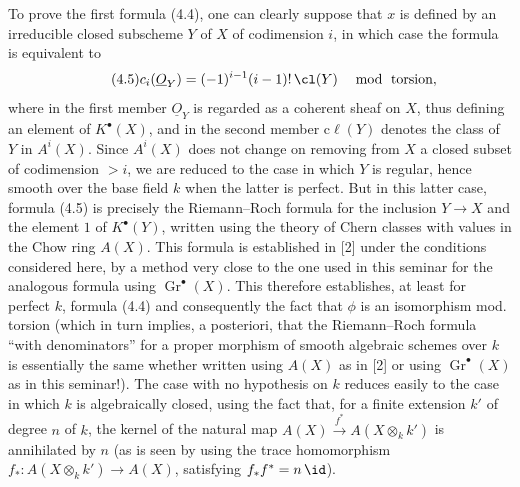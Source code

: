 To prove the first formula (4.4), one can clearly suppose that $x$ is defined by an irreducible closed subscheme $Y$ of $X$ of codimension $i$, in which case the formula is equivalent to
%
\begin{equation}\tag{4.5}
 c_i(\underline{O}_Y)=(-1)^{i-1}(i-1)!\,\cl(Y)\quad \bmod
\text{ torsion},
\end{equation}
where in the first member $\underline{O}_Y$ is regarded as a coherent sheaf on $X$, thus defining an element of $K^\bullet(X)$, and in the second member $\mathrm{c}\ell(Y)$ denotes the class of $Y$ in $A^i(X)$. Since $A^i(X)$ does not change on removing from $X$ a closed subset of codimension $>i$, we are reduced to the case in which $Y$ is regular, hence smooth over the base field $k$ when the latter is perfect. But in this latter case, formula (4.5) is precisely the Riemann--Roch formula for the inclusion $Y\to X$ and the element $1$ of $K^\bullet(Y)$, written using the theory of Chern classes with values in the Chow ring $A(X)$. This formula is established in [2] under the conditions considered here, by a method very close to the one used in this seminar for the analogous formula using $\operatorname{Gr}^\bullet(X)$. This therefore establishes, at least for perfect $k$, formula (4.4) and consequently the fact that $\phi$ is an isomorphism mod. torsion (which in turn implies, a posteriori, that the Riemann--Roch formula ``with denominators'' for a proper morphism of smooth algebraic schemes over $k$ is essentially the same whether written using $A(X)$ as in [2] or using $\operatorname{Gr}^\bullet(X)$ as in this seminar!). The case with no hypothesis on $k$ reduces easily to the case in which $k$ is algebraically closed, using the fact that, for a finite extension $k'$ of degree $n$ of $k$, the kernel of the natural map $A(X)\xrightarrow{f^*}A(X\otimes_k k')$ is annihilated by $n$ (as is seen by using the trace homomorphism $f_*:A(X\otimes_k k')\to A(X)$, satisfying $f_*f^*=n\,\id$).

